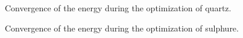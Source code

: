 \documentclass[prl,aps,preprint,superbib,12pt]{revtex4}
\begin{document}
\begin{figure}[h]
\caption{Convergence of the energy during the optimization
of quartz.}
\label{Quartz-energ}
\end{figure}

\begin{figure}[h]
\caption{Convergence of the energy during the optimization
of sulphure.}
\label{Sulphure-energ}
\end{figure}
\end{document}
